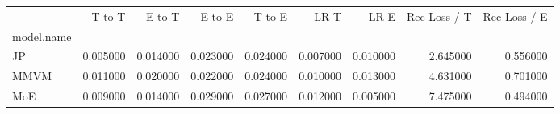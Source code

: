 \begin{tabular}{lrrrrrrrr}
\toprule
 & T to T & E to T & E to E & T to E & LR T & LR E & Rec Loss / T & Rec Loss / E \\
model.name &  &  &  &  &  &  &  &  \\
\midrule
JP & 0.005000 & 0.014000 & 0.023000 & 0.024000 & 0.007000 & 0.010000 & 2.645000 & 0.556000 \\
MMVM & 0.011000 & 0.020000 & 0.022000 & 0.024000 & 0.010000 & 0.013000 & 4.631000 & 0.701000 \\
MoE & 0.009000 & 0.014000 & 0.029000 & 0.027000 & 0.012000 & 0.005000 & 7.475000 & 0.494000 \\
\bottomrule
\end{tabular}

